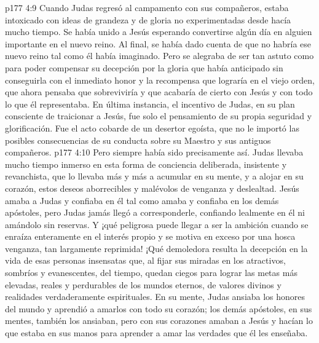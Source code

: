 \vs p177 4:9 Cuando Judas regresó al campamento con sus compañeros, estaba intoxicado con ideas de grandeza y de gloria no experimentadas desde hacía mucho tiempo. Se había unido a Jesús esperando convertirse algún día en alguien importante en el nuevo reino. Al final, se había dado cuenta de que no habría ese nuevo reino tal como él había imaginado. Pero se alegraba de ser tan astuto como para poder compensar su decepción por la gloria que había anticipado sin conseguirla con el inmediato honor y la recompensa que lograría en el viejo orden, que ahora pensaba que sobreviviría y que acabaría de cierto con Jesús y con todo lo que él representaba. En última instancia, el incentivo de Judas, en su plan consciente de traicionar a Jesús, fue solo el pensamiento de su propia seguridad y glorificación. Fue el acto cobarde de un desertor egoísta, que no le importó las posibles consecuencias de su conducta sobre su Maestro y sus antiguos compañeros.
\vs p177 4:10 Pero siempre había sido precisamente así. Judas llevaba mucho tiempo inmerso en esta forma de conciencia deliberada, insistente y revanchista, que lo llevaba más y más a acumular en su mente, y a alojar en su corazón, estos deseos aborrecibles y malévolos de venganza y deslealtad. Jesús amaba a Judas y confiaba en él tal como amaba y confiaba en los demás apóstoles, pero Judas jamás llegó a corresponderle, confiando lealmente en él ni amándolo sin reservas. Y ¡qué peligrosa puede llegar a ser la ambición cuando se enraíza enteramente en el interés propio y se motiva en exceso por una hosca venganza, tan largamente reprimida! ¡Qué demoledora resulta la decepción en la vida de esas personas insensatas que, al fijar sus miradas en los atractivos, sombríos y evanescentes, del tiempo, quedan ciegos para lograr las metas más elevadas, reales y perdurables de los mundos eternos, de valores divinos y realidades verdaderamente espirituales. En su mente, Judas ansiaba los honores del mundo y aprendió a amarlos con todo su corazón; los demás apóstoles, en sus mentes, también los ansiaban, pero con sus corazones amaban a Jesús y hacían lo que estaba en sus manos para aprender a amar las verdades que él les enseñaba.

